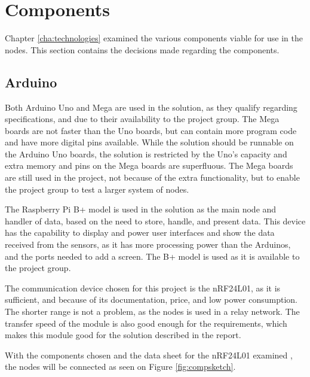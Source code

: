 \section{Components}
Chapter \ref{cha:technologies} examined the various components viable for use in the nodes. This section contains the decisions made regarding the components.

\subsection{Arduino}
Both Arduino Uno and Mega are used in the solution, as they qualify regarding specifications, and due to their availability to the project group. The Mega boards are not faster than the Uno boards, but can contain more program code and have more digital pins available. While the solution should be runnable on the Arduino Uno boards, the solution is restricted by the Uno's capacity and extra memory and pins on the Mega boards are superfluous. The Mega boards are still used in the project, not because of the extra functionality, but to enable the project group to test a larger system of nodes.

The Raspberry Pi B+ model is used in the solution as the main node and handler of data, based on the need to store, handle, and present data. This device has the capability to display and power user interfaces and show the data received from the sensors, as it has more processing power than the Arduinos, and the ports needed to add a screen. The B+ model is used as it is available to the project group.

The communication device chosen for this project is the nRF24L01, as it is sufficient, and because of its documentation, price, and low power consumption. The shorter range is not a problem, as the nodes is used in a relay network. The transfer speed of the module is also good enough for the requirements, which makes this module good for the solution described in the report.

With the components chosen and the data sheet for the nRF24L01 examined \cite{nf24datasheet}, the nodes will be connected as seen on Figure \ref{fig:compsketch}.


